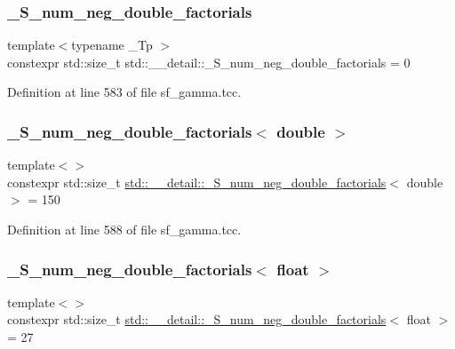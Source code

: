 \subsubsection{\texorpdfstring{\+\_\+\+S\+\_\+num\+\_\+neg\+\_\+double\+\_\+factorials}{\_S\_num\_neg\_double\_factorials}}
{\footnotesize\ttfamily template$<$typename \+\_\+\+Tp $>$ \\
constexpr std\+::size\+\_\+t std\+::\+\_\+\+\_\+detail\+::\+\_\+\+S\+\_\+num\+\_\+neg\+\_\+double\+\_\+factorials = 0}



Definition at line 583 of file sf\+\_\+gamma.\+tcc.

\mbox{\label{namespacestd_1_1____detail_a2d14a1207a6fea22f32586dfd41cf49d}} 
\subsubsection{\texorpdfstring{\+\_\+\+S\+\_\+num\+\_\+neg\+\_\+double\+\_\+factorials$<$ double $>$}{\_S\_num\_neg\_double\_factorials< double >}}
{\footnotesize\ttfamily template$<$$>$ \\
constexpr std\+::size\+\_\+t \hyperlink{namespacestd_1_1____detail_ac386f200e589ce1fc895c2aac0e47f8c}{std\+::\+\_\+\+\_\+detail\+::\+\_\+\+S\+\_\+num\+\_\+neg\+\_\+double\+\_\+factorials}$<$ double $>$ = 150}



Definition at line 588 of file sf\+\_\+gamma.\+tcc.

\mbox{\label{namespacestd_1_1____detail_a3ce62e66e9a196fd89b4d841f7374d68}} 
\subsubsection{\texorpdfstring{\+\_\+\+S\+\_\+num\+\_\+neg\+\_\+double\+\_\+factorials$<$ float $>$}{\_S\_num\_neg\_double\_factorials< float >}}
{\footnotesize\ttfamily template$<$$>$ \\
constexpr std\+::size\+\_\+t \hyperlink{namespacestd_1_1____detail_ac386f200e589ce1fc895c2aac0e47f8c}{std\+::\+\_\+\+\_\+detail\+::\+\_\+\+S\+\_\+num\+\_\+neg\+\_\+double\+\_\+factorials}$<$ float $>$ = 27}



